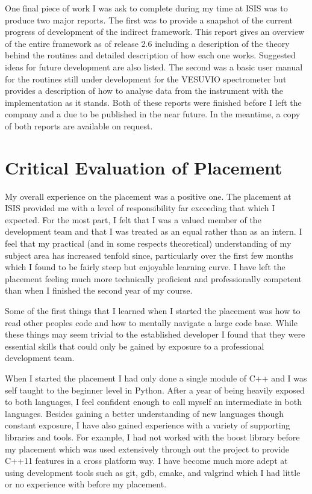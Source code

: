 \documentclass[paper=a4, fontsize=11pt]{scrartcl}	%
\numberwithin{equation}{section}															%
\numberwithin{figure}{section}																%
\numberwithin{table}{section}
\begin{document}
One final piece of work I was ask to complete during my time at ISIS was
to produce two major reports. The first was to provide a snapshot of the
current progress of development of the indirect framework. This report
gives an overview of the entire framework as of release 2.6 including a
description of the theory behind the routines and detailed description
of how each one works. Suggested ideas for future development are also
listed. The second was a basic user manual for the routines still under
development for the VESUVIO spectrometer but provides a description of
how to analyse data from the instrument with the implementation as it
stands. Both of these reports were finished before I left the company
and a due to be published in the near future. In the meantime, a copy of
both reports are available on request.

\section{Critical Evaluation of
Placement}\label{critical-evaluation-of-placement}

My overall experience on the placement was a positive one. The placement
at ISIS provided me with a level of responsibility far exceeding that
which I expected. For the most part, I felt that I was a valued member
of the development team and that I was treated as an equal rather than
as an intern. I feel that my practical (and in some respects
theoretical) understanding of my subject area has increased tenfold
since, particularly over the first few months which I found to be fairly
steep but enjoyable learning curve. I have left the placement feeling
much more technically proficient and professionally competent than when
I finished the second year of my course.

Some of the first things that I learned when I started the placement was
how to read other peoples code and how to mentally navigate a large code
base. While these things may seem trivial to the established developer I
found that they were essential skills that could only be gained by
exposure to a professional development team.

When I started the placement I had only done a single module of C++ and
I was self taught to the beginner level in Python. After a year of being
heavily exposed to both languages, I feel confident enough to call
myself an intermediate in both languages. Besides gaining a better
understanding of new languages though constant exposure, I have also
gained experience with a variety of supporting libraries and tools. For
example, I had not worked with the boost library before my placement
which was used extensively through out the project to provide C++11
features in a cross platform way. I have become much more adept at using
development tools such as git, gdb, cmake, and valgrind which I had
little or no experience with before my placement.
\end{document}
